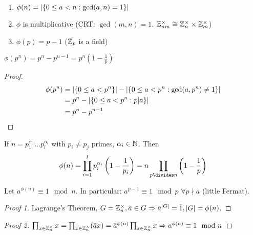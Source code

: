\documentclass[NumTh.tex]{subfiles}
\begin{document}
\begin{rem}
  \begin{enumerate}
    \item $\phi(n) = \left\vert{\left\{ 0 \leq a < n : \gcd(a,n) = 1\right\}}\right\vert$
    \item $\phi$ is multiplicative (CRT: $\gcd(m,n) = 1$. $\mathbb{Z}_{nm}^\times \cong \mathbb{Z}_n^\times \times \mathbb{Z}_m^\times$)
    \item $\phi(p) = p - 1$ ($\mathbb{Z}_p$ is a field)
  \end{enumerate}
\end{rem}

\begin{lemma}\label{l_0_4_4}
  $\phi(p^n) = p^n - p^{n-1} = p^n \left(1 - \frac{1}{p} \right)$
\end{lemma}

\begin{proof}
  \begin{align*}
    \phi(p^n) &= \left\vert{\left\{0 \leq a < p^n\right\}}\right\vert - \left\vert{\left\{0 \leq a < p^n : \gcd(a,p^n) \neq 1\right\}}\right\vert \\
              &= p^n - \left\vert{\left\{0 \leq a < p^n : p|a\right\}}\right\vert \\
              &= p^n - p^{n-1}
  \end{align*}
\end{proof}

\begin{cor}\label{cor_0_4_5}
  If $n = p_1^{\alpha_1} \dots p_l^{\alpha_l}$ with $p_i \neq p_j$ primes, $\alpha_i \in \mathbb{N}$.
  Then
  \[ \phi(n) = \prod_{i=1}^l p_i^{\alpha_i} \left(1 - \frac{1}{p_i} \right) = n \prod_{p\divides n} \left(1 - \frac{1}{p} \right) \]
\end{cor}

\begin{theorem}\label{th_0_4_6}
  Let $a^{\phi(n)} \equiv 1 \mod n$.
  In particular: $a^{p-1} \equiv 1 \mod p$ $\forall p \nmid a$ (little Fermat).
\end{theorem}

\begin{proof}[Proof 1]
  Lagrange's Theorem, $G = \Z_n^\times, \overbar{a} \in G \Rightarrow \overbar{a}^{|G|} = \overbar{1}, |G| = \phi(n)$.
\end{proof}

\begin{proof}[Proof 2]
  $\prod_{x \in \Z_n^\times} x = \prod_{x \in \Z_n^\times} (\overbar{a}x) = \overbar{a}^{\phi(n)} \prod_{x \in \Z_n^\times} x \Rightarrow a^{\phi(n)} \equiv 1 \mod n$ 
\end{proof}
\end{document}
